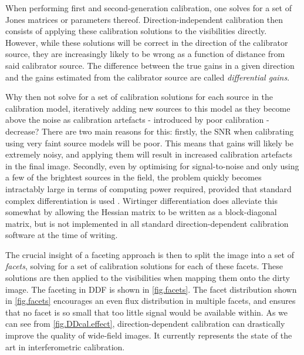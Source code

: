 \pg
When performing first and second-generation calibration, one solves for a set of Jones matrices or parameters thereof. Direction-independent calibration then consists of applying these calibration solutions to the visibilities directly. However, while these solutions will be correct in the direction of the calibrator source, they are increasingly likely to be wrong as a function of distance from said calibrator source. The difference between the true gains in a given direction and the gains estimated from the calibrator source are called \emph{differential gains}.

\pg
Why then not solve for a set of calibration solutions for each source in the calibration model, iteratively adding new sources to this model as they become above the noise as calibration artefacts - introduced by poor calibration - decrease? There are two main reasons for this: firstly, the SNR when calibrating using very faint source models will be poor. This means that gains will likely be extremely noisy, and applying them will result in increased calibration artefacts in the final image. Secondly, even by optimising for signal-to-noise and only using a few of the brightest sources in the field, the problem quickly becomes intractably large in terms of computing power required, provided that standard complex differentiation is used . Wirtinger differentiation  does alleviate this somewhat by allowing the Hessian matrix to be written as a block-diagonal matrix, but is not implemented in all standard direction-dependent calibration software at the time of writing.

\pg
The crucial insight of a faceting approach is then to split the image into a set of \emph{facets}, solving for a set of calibration solutions for each of these facets. These solutions are then applied to the visibilities when mapping them onto the dirty image. The faceting in DDF is shown in \cref{fig.facets}. The facet distribution shown in \cref{fig.facets} encourages an even flux distribution in multiple facets, and ensures that no facet is so small that too little signal would be available within. As we can see from \cref{fig.DDcal.effect}, direction-dependent calibration can drastically improve the quality of wide-field images. It currently represents the state of the art in interferometric calibration. 

